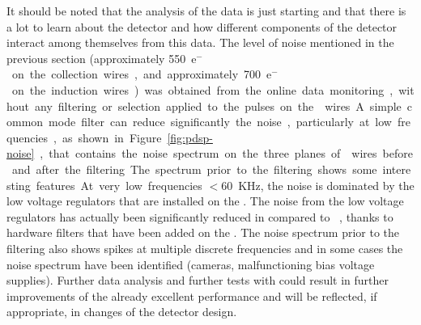 It should be noted that the analysis of the  data
is just starting and that there is a lot to learn about the
detector and how different components of the detector interact
among themselves from this data. The level of noise mentioned in
the previous section (approximately \SI{550}{e$^-$} on the collection wires,
and approximately \SI{700}{e$^-$} on the induction wires) 
was obtained from the online data monitoring, without any
filtering or selection applied to the pulses on the 
wires.A simple common mode filter can reduce significantly the 
noise, particularly at low frequencies, as shown in Figure~\ref{fig:pdsp-noise},
that contains the noise spectrum on the three planes of 
wires before and after the filtering. The spectrum prior to
the filtering shows some interesting features. At very low
frequencies $<$\SI{60}{KHz}, the noise is dominated by the
low voltage regulators that are installed on the .
The noise from the low voltage regulators has actually
been significantly reduced in  compared to
~\cite{Acciarri:2017sde}, thanks to 
hardware filters that have been added on the  
. The noise spectrum prior to the filtering
also shows spikes at multiple discrete frequencies and in
some cases the noise spectrum have been identified (cameras,
malfunctioning bias voltage supplies). Further data analysis
and further tests with  could result in further
improvements of the already excellent  performance
and will be reflected, if appropriate, in changes of the
detector design.
